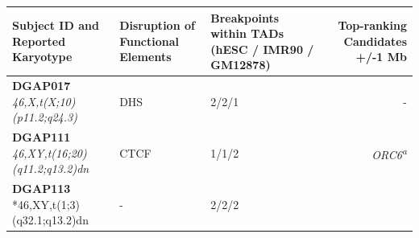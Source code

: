 \documentclass[a4paper,twoside=true,openright,parskip=full,chapterprefix=true,11pt,headings=normal,bibliography=totoc,listof=totoc,titlepage=on,captions=tableabove,draft=false]{scrreprt}
\theoremstyle{definition}
\theoremstyle{definition}
\theoremstyle{definition}
\theoremstyle{remark}
\begin{document}
\begin{longtable}[]{@{}lllr@{}}
\begin{minipage}[b]{0.25\columnwidth}
\textbf{Subject ID and Reported Karyotype}\strut
\end{minipage} & \begin{minipage}[b]{0.19\columnwidth}\raggedright
\textbf{Disruption of Functional Elements}\strut
\end{minipage} & \begin{minipage}[b]{0.26\columnwidth}\raggedright
\textbf{Breakpoints within TADs (hESC / IMR90 / GM12878)}\strut
\end{minipage} & \begin{minipage}[b]{0.18\columnwidth}\raggedleft
\textbf{Top-ranking Candidates +/-1 Mb }\strut
\end{minipage}\tabularnewline
\midrule
\endhead
\begin{minipage}[t]{0.25\columnwidth}\raggedright
\textbf{DGAP017} \emph{46,X,t(X;10)(p11.2;q24.3)}\strut
\end{minipage} & \begin{minipage}[t]{0.19\columnwidth}\raggedright
DHS\strut
\end{minipage} & \begin{minipage}[t]{0.26\columnwidth}\raggedright
2/2/1\strut
\end{minipage} & \begin{minipage}[t]{0.18\columnwidth}\raggedleft
-\strut
\end{minipage}\tabularnewline
\begin{minipage}[t]{0.25\columnwidth}\raggedright
\textbf{DGAP111} \emph{46,XY,t(16;20)(q11.2;q13.2)dn}\strut
\end{minipage} & \begin{minipage}[t]{0.19\columnwidth}\raggedright
CTCF\strut
\end{minipage} & \begin{minipage}[t]{0.26\columnwidth}\raggedright
1/1/2\strut
\end{minipage} & \begin{minipage}[t]{0.18\columnwidth}\raggedleft
\emph{ORC6\textsuperscript{a}}\strut
\end{minipage}\tabularnewline
\begin{minipage}[t]{0.25\columnwidth}\raggedright
\textbf{DGAP113} *46,XY,t(1;3)(q32.1;q13.2)dn\strut
\end{minipage} & \begin{minipage}[t]{0.19\columnwidth}\raggedright
-\strut
\end{minipage} & \begin{minipage}[t]{0.26\columnwidth}\raggedright
2/2/2\strut
\end{minipage} & \begin{minipage}[t]{0.18\columnwidth}\raggedleft

\end{minipage}
\end{longtable}
\end{document}
